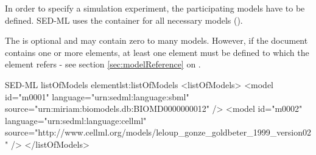 \label{sec:listOfModels}
In order to specify a simulation experiment, the participating models have to be defined. SED-ML uses the  container for all necessary models (). 

%

The  is optional and may contain zero to many models. However, if the \LoneVone document contains  one or more     elements,  at least one   element must be defined to which  the    element refers - see  section \ref{sec:modelReference} on .
%
\begin{myXmlLst}{SED-ML listOfModels element}{lst:listOfModels}
<listOfModels>
 <model id="m0001" language="urn:sedml:language:sbml" 
  source="urn:miriam:biomodels.db:BIOMD0000000012" />
 <model id="m0002" language="urn:sedml:language:cellml" 
  source="http://www.cellml.org/models/leloup_gonze_goldbeter_1999_version02" />
</listOfModels>
\end{myXmlLst}
%



